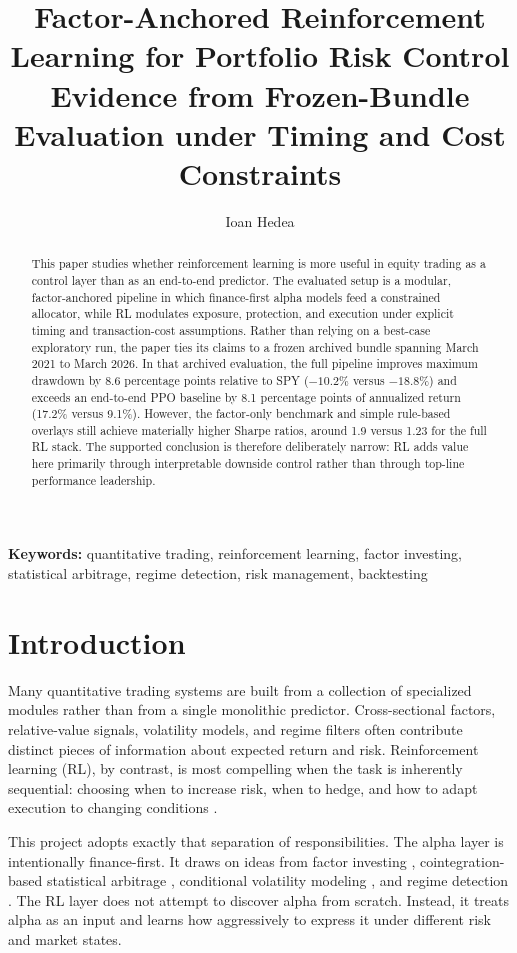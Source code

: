 \documentclass[11pt]{article}
\title{\textbf{Factor-Anchored Reinforcement Learning for Portfolio Risk Control}\\
\Large Evidence from Frozen-Bundle Evaluation under Timing and Cost Constraints}
\author{Ioan Hedea}
\date{}
\begin{document}
\maketitle

\begin{abstract}
This paper studies whether reinforcement learning is more useful in equity
trading as a control layer than as an end-to-end predictor. The evaluated setup
is a modular, factor-anchored pipeline in which finance-first alpha models feed
a constrained allocator, while RL modulates exposure, protection, and execution
under explicit timing and transaction-cost assumptions. Rather than relying on a
best-case exploratory run, the paper ties its claims to a frozen archived
bundle spanning March 2021 to March 2026. In that archived evaluation, the full
pipeline improves maximum drawdown by 8.6 percentage points relative to SPY
($-10.2\%$ versus $-18.8\%$) and exceeds an end-to-end PPO baseline by 8.1
percentage points of annualized return (17.2\% versus 9.1\%). However, the
factor-only benchmark and simple rule-based overlays still achieve materially
higher Sharpe ratios, around 1.9 versus 1.23 for the full RL stack. The
supported conclusion is therefore deliberately narrow: RL adds value here
primarily through interpretable downside control rather than through top-line
performance leadership.
\end{abstract}

\medskip
\noindent\textbf{Keywords:} quantitative trading, reinforcement learning, factor investing, statistical arbitrage, regime detection, risk management, backtesting

\section{Introduction}

Many quantitative trading systems are built from a collection of specialized
modules rather than from a single monolithic predictor. Cross-sectional factors,
relative-value signals, volatility models, and regime filters often contribute
distinct pieces of information about expected return and risk. Reinforcement
learning (RL), by contrast, is most compelling when the task is inherently
sequential: choosing when to increase risk, when to hedge, and how to adapt
execution to changing conditions \cite{sutton2018,almgren2000}.

This project adopts exactly that separation of responsibilities. The alpha layer
is intentionally finance-first. It draws on ideas from factor investing
\cite{fama1993,jegadeesh1993}, cointegration-based statistical arbitrage
\cite{engle1987}, conditional volatility modeling \cite{engle1982,bollerslev1986},
and regime detection \cite{hamilton1989}. The RL layer does not attempt to
discover alpha from scratch. Instead, it treats alpha as an input and learns how
aggressively to express it under different risk and market states.
\end{document}
